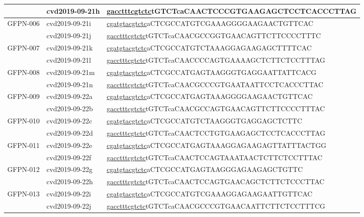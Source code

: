 \begin{landscape}
\begin{longtable}{|l|l|l|}
		& cvd2019-09-21h & \underline{gaccttt\underline{cgtctc}}tGTCTcaCAACTCCCGTGAAGAGCTCCTCACCCTTAG \\ \hline
		\multirow{2}{*}{GFPN-006} & cvd2019-09-21i & \underline{cgatgta\underline{cgtctc}}aCTCGCCATGTCGAAAGGGGAAGAACTGTTCAC     \\ \cline{2-3} 
		& cvd2019-09-21j & \underline{gaccttt\underline{cgtctc}}tGTCTcaCAACGCCGGTGAACAGTTCTTCCCCTTTC  \\ \hline
		\multirow{2}{*}{GFPN-007} & cvd2019-09-21k & \underline{cgatgta\underline{cgtctc}}aCTCGCCATGTCTAAAGGAGAAGAGCTTTTCAC     \\ \cline{2-3} 
		& cvd2019-09-21l & \underline{gaccttt\underline{cgtctc}}tGTCTcaCAACCCCAGTGAAAAGCTCTTCTCCTTTAG \\ \hline
		\multirow{2}{*}{GFPN-008} & cvd2019-09-21m & \underline{cgatgta\underline{cgtctc}}aCTCGCCATGAGTAAGGGTGAGGAATTATTCACG    \\ \cline{2-3} 
		& cvd2019-09-21n & \underline{gaccttt\underline{cgtctc}}tGTCTcaCAACGCCCGTGAATAATTCCTCACCCTTAC \\ \hline
		\multirow{2}{*}{GFPN-009} & cvd2019-09-22a & \underline{cgatgta\underline{cgtctc}}aCTCGCCATGAGTAAAGGGGAAGAACTGTTCAC     \\ \cline{2-3} 
		& cvd2019-09-22b & \underline{gaccttt\underline{cgtctc}}tGTCTcaCAACGCCAGTGAACAGTTCTTCCCCTTTAC \\ \hline
		\multirow{2}{*}{GFPN-010} & cvd2019-09-22c & \underline{cgatgta\underline{cgtctc}}aCTCGCCATGTCTAAGGGTGAGGAGCTCTTC       \\ \cline{2-3} 
		& cvd2019-09-22d & \underline{gaccttt\underline{cgtctc}}tGTCTcaCAACTCCTGTGAAGAGCTCCTCACCCTTAG \\ \hline
		\multirow{2}{*}{GFPN-011} & cvd2019-09-22e & \underline{cgatgta\underline{cgtctc}}aCTCGCCATGAGTAAAGGAGAAGAGTTATTTACTGG  \\ \cline{2-3} 
		& cvd2019-09-22f & \underline{gaccttt\underline{cgtctc}}tGTCTcaCAACTCCAGTAAATAACTCTTCTCCTTTAC \\ \hline
		\multirow{2}{*}{GFPN-012} & cvd2019-09-22g & \underline{cgatgta\underline{cgtctc}}aCTCGCCATGAGTAAGGGAGAAGAGCTGTTC       \\ \cline{2-3} 
		& cvd2019-09-22h & \underline{gaccttt\underline{cgtctc}}tGTCTcaCAACTCCAGTGAACAGCTCTTCTCCCTTAC \\ \hline
		\multirow{2}{*}{GFPN-013} & cvd2019-09-22i & \underline{cgatgta\underline{cgtctc}}aCTCGCCATGTCGAAAGGAGAAGAATTGTTCAC     \\ \cline{2-3} 
		& cvd2019-09-22j & \underline{gaccttt\underline{cgtctc}}tGTCTcaCAACGCCCGTGAACAATTCTTCTCCTTTCG \\ \hline

\end{longtable}
\end{landscape}
